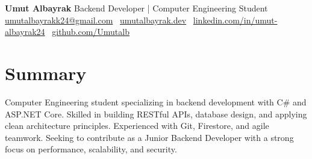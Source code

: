 \documentclass[10pt,a4paper]{extarticle}
\begin{document}
\begin{center}
    \begin{minipage}{\textwidth}
        \centering
        {\LARGE\textbf{Umut Albayrak}} \hspace{2pt} {\large{Backend Developer | Computer Engineering Student}}\\[10pt]
        \href{mailto:umutalbayrakk24@gmail.com}{umutalbayrakk24@gmail.com} \textbullet\
        \href{https://umutalbayrak.dev}{umutalbayrak.dev} \textbullet\
        \href{https://linkedin.com/in/umut-albayrak24}{linkedin.com/in/umut-albayrak24} \textbullet\
        \href{https://github.com/Umutalb}{github.com/Umutalb}
    \end{minipage}
\end{center}

\section{Summary}
Computer Engineering student specializing in backend development with C\# and ASP.NET Core. Skilled in building RESTful APIs, database design, and applying clean architecture principles. Experienced with Git, Firestore, and agile teamwork. Seeking to contribute as a Junior Backend Developer with a strong focus on performance, scalability, and security.
\end{document}
